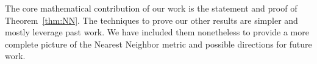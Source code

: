 The core mathematical contribution of our work is the
statement and proof of Theorem~\ref{thm:NN}.  The techniques to prove
our other results are simpler and mostly leverage past work. We have
included them
nonetheless to provide a more complete picture of the Nearest Neighbor
metric and possible directions for future work.


